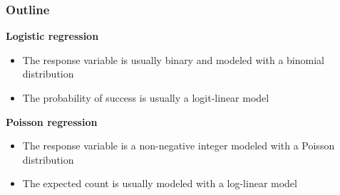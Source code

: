 \documentclass[color=usenames,dvipsnames]{beamer}\usepackage[]{graphicx}\usepackage[]{color}
\begin{document}
\begin{frame}
  \frametitle{Outline}
  {\bf Logistic regression \\}
  \begin{itemize}
    \item The response variable is usually binary and modeled with a
      binomial distribution
    \item The probability of success is usually a logit-linear
      model
  \end{itemize}
  \pause
  \vfill
  {\bf Poisson regression \\}
  \begin{itemize}
    \item The response variable is a non-negative integer modeled with
      a Poisson distribution
    \item The expected count is usually modeled with a log-linear
      model
  \end{itemize}
  \vfill
\end{frame}



\end{document}
